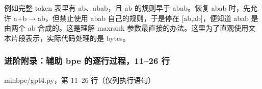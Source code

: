\documentclass[11pt,a4paper]{article}
\newlength{\BpeDocTableWidth}
\newcommand{\BpeDocCodeInline}[1]{{\ttfamily #1}}
\newcommand{\BpeDocSubsubsection}[2]{\subsubsection{\texorpdfstring{#1}{#2}}}
\begin{document}
例如完整 \BpeDocCodeInline{token} 表里有 ab、abab，且 ab 的规则早于 abab。恢复 abab 时，先允许 a+b\(\rightarrow\)ab，但禁止使用 abab 自己的规则，于是停在 [ab,ab]，便知道 abab 是由两个 ab 合成的。这是理解 \BpeDocCodeInline{max\relax\allowbreak{}rank} 参数最直接的办法。这里为了直观使用文本片段表示，实际代码处理的是 \BpeDocCodeInline{bytes}。


\BpeDocSubsubsection{进阶附录：辅助 \BpeDocCodeInline{bpe} 的逐行过程，11–26 行}{进阶附录：辅助 bpe 的逐行过程，11–26 行}


\begingroup\fontsize{8.9}{12.2}\selectfont{}
\setlength{\BpeDocTableWidth}{\dimexpr\linewidth-6\tabcolsep\relax}
\renewcommand{\arraystretch}{1.08}
{\small \BpeDocCodeInline{minbpe/\allowbreak{}gpt4.\allowbreak{}py}，第 11–26 行（仅列执行语句）}
\end{document}
